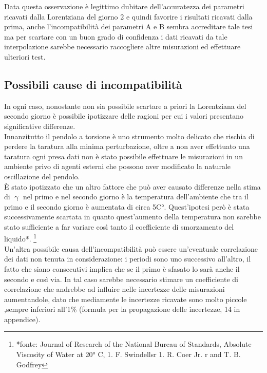 \documentclass{article}
\begin{document}
Data questa osservazione è legittimo dubitare dell'accuratezza dei parametri ricavati dalla Lorentziana del giorno 2 e quindi favorire i risultati ricavati dalla prima, anche l'incompatibilità dei parametri A e B sembra accreditare tale tesi ma per scartare con un buon grado di confidenza i dati ricavati da tale interpolazione sarebbe necessario  raccogliere altre misurazioni ed effettuare ulteriori test.
\subsection{Possibili cause di incompatibilità}
In ogni caso, nonostante non sia possibile scartare a priori la Lorentziana del secondo giorno è possibile ipotizzare delle ragioni per cui i valori presentano significative differenze.
\\Innanzitutto il pendolo a torsione è uno strumento molto delicato che rischia di perdere la taratura alla minima perturbazione, oltre a non aver effettuato una taratura ogni presa dati non è stato possibile effettuare le misurazioni in un ambiente privo di agenti esterni che possono aver modificato la naturale oscillazione del pendolo.
\\È stato ipotizzato che un altro fattore che può aver causato differenze nella stima di $\upgamma$ nel primo e nel secondo giorno è la temperatura dell'ambiente che tra il primo e il secondo giorno è aumentata di circa 5C°. Quest'ipotesi però è stata successivamente scartata in quanto quest'aumento della temperatura non sarebbe stato sufficiente a far variare così tanto il coefficiente di smorzamento del liquido*.
\footnote{*fonte: Journal of Research of the National Bureau of Standards, Absolute Viscosity of Water at 20° C, 1. F. Swindellsr 1. R. Coer Jr. r and T. B. Godfrey  }
\\Un'altra possibile causa dell'incompatibilità può essere un'eventuale correlazione dei dati non tenuta in considerazione: i periodi sono uno successivo all'altro, il fatto che siano consecutivi implica che se il primo è sfasato lo sarà anche il secondo e così via. In tal caso sarebbe necessario stimare un coefficiente di correlazione che andrebbe ad influire nelle incertezze delle misurazioni aumentandole, dato che mediamente le incertezze ricavate sono molto piccole ,sempre inferiori all'1\% (formula per la propagazione delle incertezze, 14 in appendice).
\end{document}
